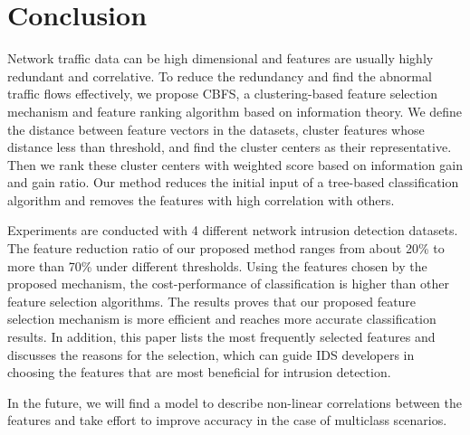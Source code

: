 \documentclass{ieeeaccess}
\theoremstyle{definition}
\begin{document}
\section{Conclusion}
\label{sec:conclusion}

Network traffic data can be high dimensional and features are usually highly redundant and correlative. 
To reduce the redundancy and find the abnormal traffic flows effectively, we propose CBFS, a clustering-based feature selection mechanism and feature ranking algorithm based on information theory. 
We define the distance between feature vectors in the datasets, cluster features whose distance less than threshold, and find the cluster centers as their representative. 
Then we rank these cluster centers with weighted score based on information gain and gain ratio. 
Our method reduces the initial input of a tree-based classification algorithm and removes the features with high correlation with others. 

Experiments are conducted with 4 different network intrusion detection datasets. 
The feature reduction ratio of our proposed method ranges from about 20\% to more than 70\% under different thresholds. 
Using the features chosen by the proposed mechanism, the cost-performance of classification is higher than other feature selection algorithms. 
The results proves that our proposed feature selection mechanism is more efficient and reaches more accurate classification results. 
In addition, this paper lists the most frequently selected features and discusses the reasons for the selection, which can guide IDS developers in choosing the features that are most beneficial for intrusion detection.

In the future, we will find a model to describe non-linear correlations between the features and take effort to improve accuracy in the case of multiclass scenarios. 
\end{document}
